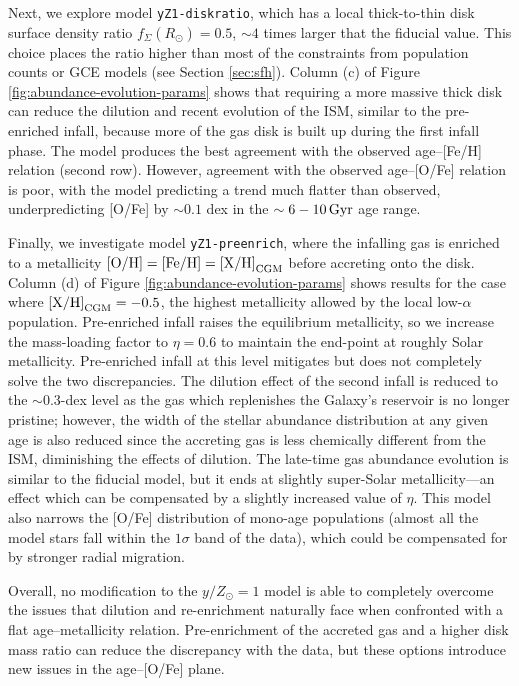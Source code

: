 \documentclass[twocolumn,twocolappendix,linenumbers]{aastex631}
\newcommand{\mathOH}{{\rm [O/H]}}
\newcommand{\mathFeH}{{\rm [Fe/H]}}
\newcommand{\yZ}[1]{$y/Z_\odot=#1$}
\newcommand{\Gyr}{\,{\rm Gyr}}
\begin{document}
Next, we explore model {\tt yZ1-diskratio}, which has a local thick-to-thin disk surface density ratio $f_\Sigma(R_\odot)=0.5$, $\sim4$ times larger that the fiducial value. This choice places the ratio higher than most of the constraints from population counts or GCE models (see Section \ref{sec:sfh}). Column (c) of Figure \ref{fig:abundance-evolution-params} shows that requiring a more massive thick disk can reduce the dilution and recent evolution of the ISM, similar to the pre-enriched infall, because more of the gas disk is built up during the first infall phase. The model produces the best agreement with the observed age--[Fe/H] relation (second row). However, agreement with the observed age--[O/Fe] relation is poor, with the model predicting a trend much flatter than observed, underpredicting [O/Fe] by $\sim0.1$ dex in the $\sim6-10\Gyr$ age range.

Finally, we investigate model {\tt yZ1-preenrich}, where the infalling gas is enriched to a metallicity $\mathOH=\mathFeH={\rm [X/H]}_{\rm CGM}$ before accreting onto the disk. Column (d) of Figure \ref{fig:abundance-evolution-params} shows results for the case where ${\rm [X/H]}_{\rm CGM}=-0.5$, the highest metallicity allowed by the local low-$\alpha$ population. Pre-enriched infall raises the equilibrium metallicity, so we increase the mass-loading factor to $\eta=0.6$ to maintain the end-point at roughly Solar metallicity. Pre-enriched infall at this level mitigates but does not completely solve the two discrepancies. The dilution effect of the second infall is reduced to the $\sim0.3$-dex level as the gas which replenishes the Galaxy's reservoir is no longer pristine; however, the width of the stellar abundance distribution at any given age is also reduced since the accreting gas is less chemically different from the ISM, diminishing the effects of dilution. The late-time gas abundance evolution is similar to the fiducial model, but it ends at slightly super-Solar metallicity---an effect which can be compensated by a slightly increased value of $\eta$. This model also narrows the [O/Fe] distribution of mono-age populations (almost all the model stars fall within the $1\sigma$ band of the data), which could be compensated for by stronger radial migration.

Overall, no modification to the \yZ{1} model is able to completely overcome the issues that dilution and re-enrichment naturally face when confronted with a flat age--metallicity relation. Pre-enrichment of the accreted gas and a higher disk mass ratio can reduce the discrepancy with the data, but these options introduce new issues in the age--[O/Fe] plane. 
\end{document}
